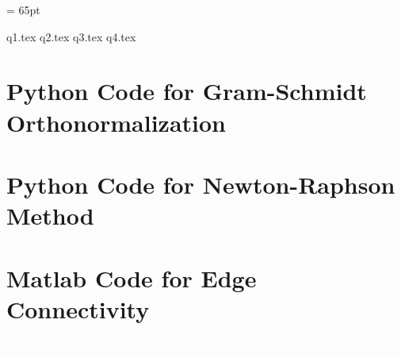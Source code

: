 \documentclass[12pt]{extarticle}
\begin{document}
      

        \thispagestyle{firstpage}
        \headsep = 65pt %

        {q1.tex}     
        {q2.tex}
        {q3.tex}
        {q4.tex}

        \pagebreak
        \section*{Python Code for Gram-Schmidt Orthonormalization}
        

        \pagebreak
        \section*{Python Code for Newton-Raphson Method}
        

        \pagebreak
        \section*{Matlab Code for Edge Connectivity}
        

                \textcolor{white}{a}

                \pagebreak
\end{document}
